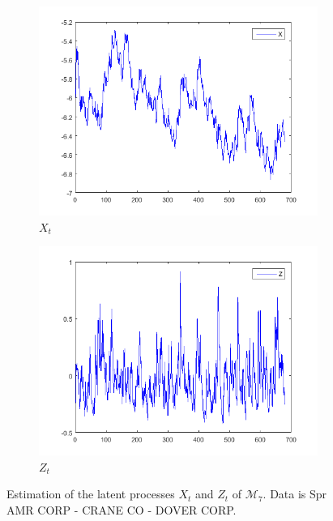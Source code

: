 \documentclass[11pt,a4,twosided,singlespacing,titlepagenumber=on]{scrreprt}
\numberwithin{equation}{chapter} %
\theoremstyle{remark}
\begin{document}
\begin{figure}[H]
    \centering
    \begin{subfigure}[t]{0.42\textwidth}
        \centering
        \includegraphics[width=1\textwidth]{est/1}
        \caption{$X_t$}
        \label{est_1}
    \end{subfigure}
    \begin{subfigure}[t]{0.42\textwidth}
        \centering
        \includegraphics[width=1\textwidth]{est/2}
        \caption{$Z_t$}
        \label{est_2}
    \end{subfigure}
    \caption{Estimation of the latent processes $X_t$ and $Z_t$ of $\mathcal{M}_7$. Data is Spr AMR CORP - CRANE CO - DOVER CORP.}
    \label{estimation_of_latent_processes}
\end{figure}
\end{document}
